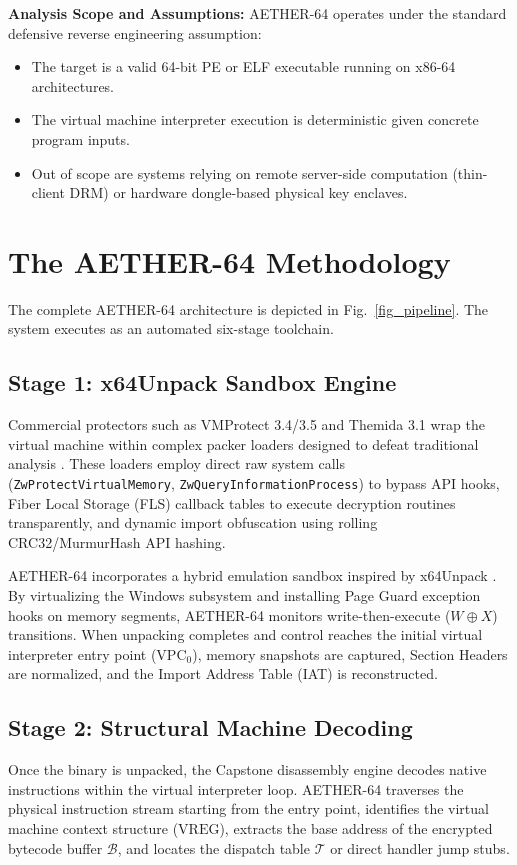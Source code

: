 \documentclass[11pt,a4paper]{article}
\begin{document}
\textbf{Analysis Scope and Assumptions:} AETHER-64 operates under the standard defensive reverse engineering assumption:
\begin{itemize}
    \item The target is a valid 64-bit PE or ELF executable running on x86-64 architectures.
    \item The virtual machine interpreter execution is deterministic given concrete program inputs.
    \item Out of scope are systems relying on remote server-side computation (thin-client DRM) or hardware dongle-based physical key enclaves.
\end{itemize}

\section{The AETHER-64 Methodology}
The complete AETHER-64 architecture is depicted in Fig.~\ref{fig_pipeline}. The system executes as an automated six-stage toolchain.

\subsection{Stage 1: x64Unpack Sandbox Engine}
Commercial protectors such as VMProtect 3.4/3.5 and Themida 3.1 wrap the virtual machine within complex packer loaders designed to defeat traditional analysis \cite{x64unpack}. These loaders employ direct raw system calls (\texttt{ZwProtectVirtualMemory}, \texttt{ZwQueryInformationProcess}) to bypass API hooks, Fiber Local Storage (FLS) callback tables to execute decryption routines transparently, and dynamic import obfuscation using rolling CRC32/MurmurHash API hashing.

AETHER-64 incorporates a hybrid emulation sandbox inspired by x64Unpack \cite{x64unpack}. By virtualizing the Windows subsystem and installing Page Guard exception hooks on memory segments, AETHER-64 monitors write-then-execute ($W \oplus X$) transitions. When unpacking completes and control reaches the initial virtual interpreter entry point ($\text{VPC}_0$), memory snapshots are captured, Section Headers are normalized, and the Import Address Table (IAT) is reconstructed.

\subsection{Stage 2: Structural Machine Decoding}
Once the binary is unpacked, the Capstone disassembly engine \cite{capstone} decodes native instructions within the virtual interpreter loop. AETHER-64 traverses the physical instruction stream starting from the entry point, identifies the virtual machine context structure ($\text{VREG}$), extracts the base address of the encrypted bytecode buffer $\mathcal{B}$, and locates the dispatch table $\mathcal{T}$ or direct handler jump stubs.
\end{document}
